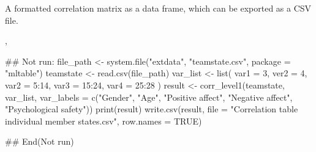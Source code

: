 \documentclass[a4paper]{book}
\begin{document}
%
\begin{Value}
A formatted correlation matrix as a data frame, which can be exported
as a CSV file.
\end{Value}
%
\begin{SeeAlso}
, 
\end{SeeAlso}
%
\begin{Examples}
\begin{ExampleCode}
## Not run: 
file_path <- system.file("extdata", "teamstate.csv", package = "mltable")
teamstate <- read.csv(file_path)
var_list <- list(
  var1 = 3,
  ver2 = 4,
  var2 = 5:14,
  var3 = 15:24,
  var4 = 25:28
)
result <- corr_level1(teamstate,
                      var_list,
                      var_labels = c("Gender", "Age", "Positive affect",
                      "Negative affect", "Psychological safety"))
print(result)
write.csv(result, file = "Correlation table individual member states.csv", row.names = TRUE)

## End(Not run)

\end{ExampleCode}
\end{Examples}
\printindex{}
\end{document}
